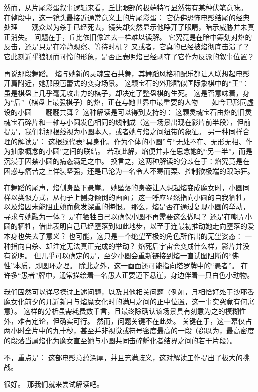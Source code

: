 然而，从片尾彩蛋叙事逻辑来看，丘比眼部的极端特写显然带有某种伏笔意味。
在整段中，这一镜头最接近通常意义上的片尾彩蛋：
它仿佛恐怖电影结尾的经典处理——观众以为杀手已经死去，镜头却突然显示他睁开了眼睛，暗示威胁并未真正消失。
问题在于，丘比依旧像过去一样难以读解。
它究竟是在暗中筹划对焰的反击，还是只是在冷静观察、等待时机？
又或者，它真的已经被焰彻底击溃了？
它此刻近乎狼狈而可怜的形象，是否正表明焰已经剥夺了它作为反派的叙事位置？

再说那段舞蹈。
焰与她新的灵魂宝石共舞，其舞蹈风格和配乐都让人联想起电影开篇附近，她那段芭蕾式的变身场景。
这颗宝石的外形酷似国际象棋中的“王”：虽是棋盘上几乎毫无攻击力的棋子，却决定了整盘棋的生死。
这是否意味着，身为“后”（棋盘上最强棋子）的焰，正在与她世界中最重要的人物——如今已形同虚设的小圆——翩翩共舞？
这种解读是可以得到支持的：
这颗灵魂宝石由焰的旧灵魂宝石碎片和一轴与小圆发色相同的线制成（这一场景出现在影片前半段），但前提是，我们将那根线视为小圆本人，或者她与焰之间纽带的象征。
另一种同样合理的解读是：
这根线代表“具身化、作为个体的小圆”与“无处不在、无形无相、作为抽象概念的小圆”之间的联结。
若取此解，焰便并非在思念她的“另一半”，而是沉浸于囚禁小圆的病态满足之中。
换言之，这两种解读的分歧在于：焰究竟是在困惑与痛苦之上佯装坚强，还是已沦为一名令人不寒而栗、控制欲极端的跟踪狂。

在舞蹈的尾声，焰侧身坠下悬崖。
她坠落的身姿让人想起焰变成魔女时，小圆同样以类似方式，从椅子上侧身倾倒的画面；
这一呼应显然指向小圆的自我牺牲，以及焰因未能阻止她而愈发深重的悔恨。
那么，焰是否在通过复现小圆的举动，寻求与她融为一体？
是在牺牲自己以确保小圆不再需要这么做吗？
还是在嘲弄小圆的牺牲，借此表明自己已经堕落到如此地步，以至于连最初推动她走向堕落的爱本身也失去了意义？
也可能，这只是一个绝望至极的角色所作出的无望姿态：
一种指向自杀、却注定无法真正完成的举动？
焰死后宇宙会变成什么样，影片并没有说明。
但几乎可以确定的是，至少小圆会重新链接到焰一直试图阻断的“佛性”本质，即圆环之理。
除此之外，这一画面还可能指向塔罗牌中的“愚者”。
在许多“愚者”牌中，通常描绘着一名愚人正要迈下悬崖，身边伴着一只白色小动物。

我们固然可以详尽探讨上述问题，以及其他相关问题（例如，月相恰好处于沙耶香魔女化前夕的几近新月与焰魔女化时的满月之间的正中位置，这一事实究竟有何寓意）。%
这样的分析虽需耗费数千言，且最终除确认该场景具有刻意为之的模糊性外，难有定论，但确实可行。
然而，问题关键不在此处。
关键在于，这一幕仅占两小时全片中的九十秒，甚至并非视觉或符号密度最高的一段（窃以为，最高密度的段落当属焰化为魔女直至她与小圆共同击碎孵化者结界之间的若干片段）。

不，重点是：
这部电影意蕴深厚，并且充满歧义，这对解读工作提出了极大的挑战。

很好。
那我们就来尝试解读吧。
